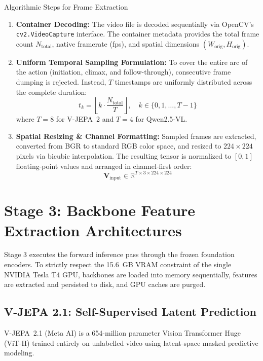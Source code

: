 \documentclass[a4paper, 11pt]{article}
\begin{document}
\begin{methodbox}{Algorithmic Steps for Frame Extraction}
\begin{enumerate}
    \item \textbf{Container Decoding:} The video file is decoded sequentially via OpenCV's \texttt{cv2.VideoCapture} interface. The container metadata provides the total frame count $N_{\text{total}}$, native framerate (fps), and spatial dimensions $(W_{\text{orig}}, H_{\text{orig}})$.
    \item \textbf{Uniform Temporal Sampling Formulation:} To cover the entire arc of the action (initiation, climax, and follow-through), consecutive frame dumping is rejected. Instead, $T$ timestamps are uniformly distributed across the complete duration:
    \begin{equation}
        t_k = \left\lfloor k \cdot \frac{N_{\text{total}}}{T} \right\rfloor, \quad k \in \{0, 1, \dots, T-1\}
    \end{equation}
    where $T = 8$ for V-JEPA~2 and $T = 4$ for Qwen2.5-VL.
    \item \textbf{Spatial Resizing \& Channel Formatting:} Sampled frames are extracted, converted from BGR to standard RGB color space, and resized to $224 \times 224$ pixels via bicubic interpolation. The resulting tensor is normalized to $[0, 1]$ floating-point values and arranged in channel-first order:
    \begin{equation}
        \mathbf{V}_{\text{input}} \in \mathbb{R}^{T \times 3 \times 224 \times 224}
    \end{equation}
\end{enumerate}
\end{methodbox}

\section{Stage 3: Backbone Feature Extraction Architectures}

Stage 3 executes the forward inference pass through the frozen foundation encoders. To strictly respect the 15.6~GB VRAM constraint of the single NVIDIA Tesla T4 GPU, backbones are loaded into memory sequentially, features are extracted and persisted to disk, and GPU caches are purged.

\subsection{V-JEPA 2.1: Self-Supervised Latent Prediction}
V-JEPA~2.1 (Meta AI) is a 654-million parameter Vision Transformer Huge (ViT-H) trained entirely on unlabelled video using latent-space masked predictive modeling.
\end{document}
